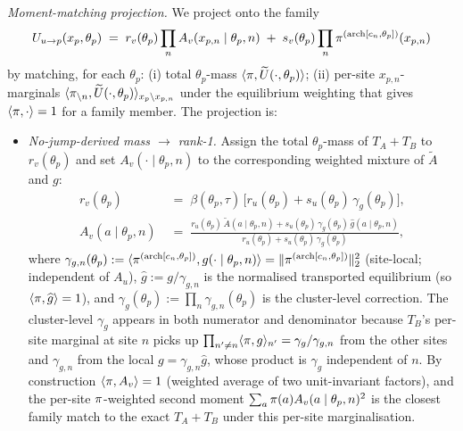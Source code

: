 \emph{Moment-matching projection.} We project onto the family
\begin{equation}
U_{u \to p}(x_p, \theta_p) \;=\; r_v(\theta_p) \prod_n A_v(x_{p,n} \mid \theta_p, n)
    \;+\; s_v(\theta_p) \prod_n \pi^{(\mathrm{arch}[c_n, \theta_p])}(x_{p,n})
    \label{eq:arch-mmedge-U-form}
\end{equation}
by matching, for each $\theta_p$: (i) total $\theta_p$-mass
$\langle \pi, \widetilde U(\cdot, \theta_p) \rangle$; (ii) per-site
$x_{p, n}$-marginals $\langle \pi_{\backslash n}, \widetilde U(\cdot,
\theta_p) \rangle_{x_p \setminus x_{p, n}}$ under the equilibrium
weighting that gives $\langle \pi, \cdot \rangle = 1$ for a family
member. The projection is:
\begin{itemize}[leftmargin=1.6em]
\item \emph{No-jump-derived mass $\to$ rank-1.} Assign the total
    $\theta_p$-mass of $T_A + T_B$ to $r_v(\theta_p)$ and set
    $A_v(\cdot \mid \theta_p, n)$ to the corresponding weighted mixture
    of $\widetilde A$ and $g$:
    \begin{align}
      r_v(\theta_p)
        &\;=\; \beta(\theta_p, \tau)\,\bigl[r_u(\theta_p) + s_u(\theta_p)\,\gamma_g(\theta_p)\bigr],
        \label{eq:arch-mmedge-rv} \\
      A_v(a \mid \theta_p, n)
        &\;=\; \frac{r_u(\theta_p)\,\widetilde A(a \mid \theta_p, n)
                     + s_u(\theta_p)\,\gamma_g(\theta_p)\,\widehat g(a \mid \theta_p, n)}
                    {r_u(\theta_p) + s_u(\theta_p)\,\gamma_g(\theta_p)},
        \label{eq:arch-mmedge-Av}
    \end{align}
    where $\gamma_{g, n}(\theta_p) := \langle \pi^{(\mathrm{arch}[c_n, \theta_p])}, g(\cdot \mid \theta_p, n) \rangle
    = \|\pi^{(\mathrm{arch}[c_n, \theta_p])}\|_2^2$ (site-local; independent of
    $A_u$), $\widehat g := g / \gamma_{g, n}$ is the normalised
    transported equilibrium (so $\langle \pi, \widehat g \rangle = 1$),
    and $\gamma_g(\theta_p) := \prod_n \gamma_{g, n}(\theta_p)$ is the
    cluster-level correction. The cluster-level $\gamma_g$ appears in
    both numerator and denominator because $T_B$'s per-site marginal at
    site $n$ picks up $\prod_{n' \ne n} \langle \pi, g \rangle_{n'} =
    \gamma_g / \gamma_{g, n}$ from the other sites and $\gamma_{g, n}$
    from the local $g = \gamma_{g, n} \widehat g$, whose product is
    $\gamma_g$ independent of $n$. By construction $\langle \pi, A_v
    \rangle = 1$ (weighted average of two unit-invariant factors), and
    the per-site $\pi$-weighted second moment
    $\sum_a \pi(a) A_v(a \mid \theta_p, n)^2$ is the closest family
    match to the exact $T_A + T_B$ under this per-site marginalisation.


\end{itemize}
